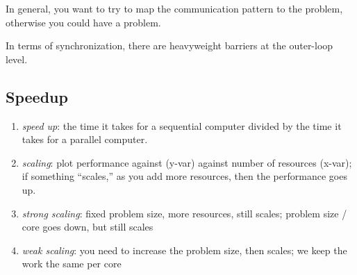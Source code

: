 In general, you want to try to map the communication pattern to the problem, otherwise you could have a problem.

In terms of synchronization, there are heavyweight barriers at the outer-loop level.

\subsection{Speedup}
\begin{enumerate}
    \item \textit{speed up}: the time it takes for a sequential computer divided by the time it takes for a parallel computer.
    \item \textit{scaling}: plot performance against (y-var) against number of resources (x-var); if something ``scales,'' as you add more resources, then the performance goes up.
    \item \textit{strong scaling}: fixed problem size, more resources, still scales; problem size / core goes down, but still scales
    \item \textit{weak scaling}: you need to increase the problem size, then scales; we keep the work the same per core
\end{enumerate}


